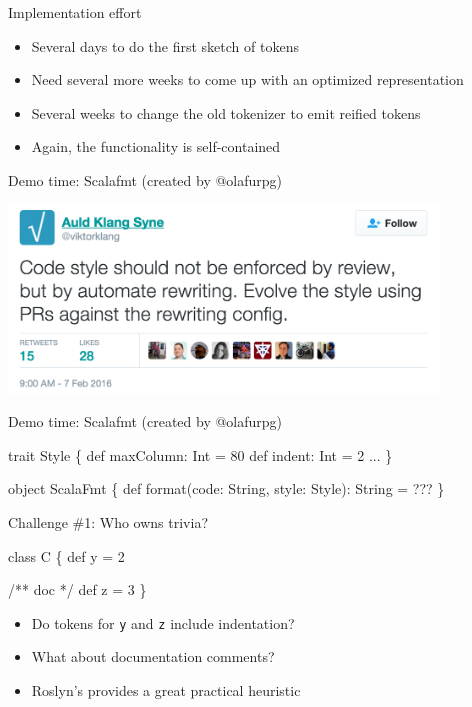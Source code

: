 \documentclass[svgnames,dvipsnames,hyperref={bookmarks=false},usepdftitle=false]{beamer}
\begin{document}
\begin{frame}{Implementation effort}
\begin{itemize}
\item Several days to do the first sketch of tokens
\item Need several more weeks to come up with an optimized representation
\item Several weeks to change the old tokenizer to emit reified tokens
\item Again, the functionality is self-contained
\end{itemize}
\end{frame}

\begin{frame}{Demo time: Scalafmt (created by @olafurpg)}
\begin{center}
\includegraphics[height=5cm]{klang.png}
\end{center}
\end{frame}

\begin{frame}[fragile]{Demo time: Scalafmt (created by @olafurpg)}
\begin{semiverbatim}
trait Style \{
  def maxColumn: Int = 80
  def indent: Int = 2
  ...
\}

object ScalaFmt \{
  def format(code: String, style: Style): String = ???
\}
\end{semiverbatim}
\end{frame}

\begin{frame}[fragile]{Challenge \#1: Who owns trivia?}
\begin{semiverbatim}
class C \{
  def y = 2

  /** doc */
  def z = 3
\}

\end{semiverbatim}

\begin{itemize}
\item Do tokens for \texttt{y} and \texttt{z} include indentation?
\item What about documentation comments?
\item Roslyn's provides a great practical heuristic
\end{itemize}
\end{frame}
\end{document}
